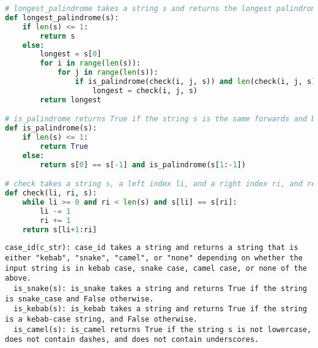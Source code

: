 \begin{figure*}[h]
\begin{lstlisting}[language=Python]
# longest_palindrome takes a string s and returns the longest palindrome in s.
def longest_palindrome(s):
    if len(s) <= 1:
        return s
    else:
        longest = s[0]
        for i in range(len(s)):
            for j in range(len(s)):
                if is_palindrome(check(i, j, s)) and len(check(i, j, s)) > len(longest):
                    longest = check(i, j, s)
        return longest

# is_palindrome returns True if the string s is the same forwards and backwards, and False otherwise.
def is_palindrome(s):
    if len(s) <= 1:
        return True
    else:
        return s[0] == s[-1] and is_palindrome(s[1:-1])

# check takes a string s, a left index li, and a right index ri, and returns the longest palindrome that starts at or before li and ends at or after ri.
def check(li, ri, s):
    while li >= 0 and ri < len(s) and s[li] == s[ri]:
        li -= 1
        ri += 1
    return s[li+1:ri]
\end{lstlisting}
\caption{Train Problem 1638, Solution 2}
\end{figure*}

\begin{figure*}
\begin{lstlisting}
case_id(c_str): case_id takes a string and returns a string that is either "kebab", "snake", "camel", or "none" depending on whether the input string is in kebab case, snake case, camel case, or none of the above.
  is_snake(s): is_snake takes a string and returns True if the string is snake_case and False otherwise.
  is_kebab(s): is_kebab takes a string and returns True if the string is a kebab-case string, and False otherwise.
  is_camel(s): is_camel returns True if the string s is not lowercase, does not contain dashes, and does not contain underscores.
\end{lstlisting}
\caption{Train Problem 2892, Solution 7}
\end{figure*}

